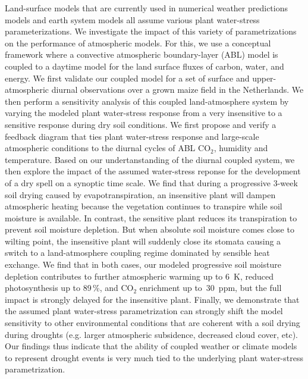 \documentclass[10pt,a4paper,notitlepage,twoside]{article}
\begin{document}
Land-surface models that are currently used in numerical weather predictions models and earth system models all assume various plant water-stress parameterizations. We investigate the impact of this variety of parametrizations on the performance of atmospheric models. For this, we use a conceptual framework where a convective atmospheric boundary-layer (ABL) model is coupled to a daytime model for the land surface fluxes of carbon, water, and energy. We first validate our coupled model for a set of surface and upper-atmospheric diurnal observations over a grown maize field in the Netherlands. We then perform a sensitivity analysis of this coupled land-atmosphere system by varying the modeled plant water-stress response from a very insensitive to a sensitive response during dry soil conditions. We first propose and verify a feedback diagram that ties plant water-stress response and large-scale atmospheric conditions to the diurnal cycles of ABL CO$_2$, humidity and temperature. Based on our undertanstanding of the diurnal coupled system, we then explore the impact of the assumed water-stress reponse for the development of a dry spell on a synoptic time scale. We find that during a progressive 3-week soil drying caused by evapotranspiration, an insensitive plant will dampen atmospheric heating because the vegetation continues to transpire while soil moisture is available. In contrast, the sensitive plant reduces its transpiration to prevent soil moisture depletion. But when absolute soil moisture comes close to wilting point, the insensitive plant will suddenly close its stomata causing a switch to a land-atmosphere coupling regime dominated by sensible heat exchange. We find that in both cases, our modeled progressive soil moisture depletion contributes to further atmospheric warming up to 6~K, reduced photosynthesis up to 89\,\%, and CO$_2$ enrichment up to~30~ppm, but the full impact is strongly delayed for the insensitive plant. Finally, we demonstrate that the assumed plant water-stress parametrization can strongly shift the model sensitivity to other environmental conditions that are coherent with a soil drying during droughts (e.g. larger atmospheric subsidence, decreased cloud cover, etc). Our findings thus indicate that the ability of coupled weather or climate models to represent drought events is very much tied to the underlying plant water-stress parametrization.
\end{document}
